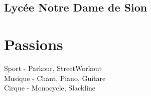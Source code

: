 \documentclass[]{cv-template}
\begin{document}
\begin{minipage}[t]{0.34\textwidth}
\subsection{Lycée Notre Dame de Sion}
\sectionsep



\section{Passions}
Sport - Parkour, StreetWorkout \\
Musique - Chant, Piano, Guitare\\
Cirque - Monocycle, Slackline
\sectionsep





%
%
\end{minipage} 
\end{document}
